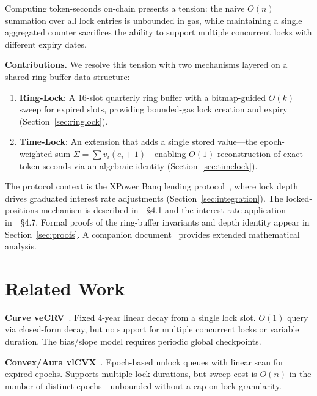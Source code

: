 \documentclass[10pt,a4paper,twocolumn]{article}
\theoremstyle{definition}
\theoremstyle{plain}
\theoremstyle{remark}
\begin{document}
Computing token-seconds on-chain presents a tension: the naive $O(n)$ summation over all lock entries is unbounded in gas, while maintaining a single aggregated counter sacrifices the ability to support multiple concurrent locks with different expiry dates.

\textbf{Contributions.} We resolve this tension with two mechanisms layered on a shared ring-buffer data structure:

\begin{enumerate}[leftmargin=*]
\item \textbf{Ring-Lock}: A 16-slot quarterly ring buffer with a bitmap-guided $O(k)$ sweep for expired slots, providing bounded-gas lock creation and expiry (Section~\ref{sec:ringlock}).

\item \textbf{Time-Lock}: An extension that adds a single stored value---the epoch-weighted sum $\Sigma = \sum v_i(e_i{+}1)$---enabling $O(1)$ reconstruction of exact token-seconds via an algebraic identity (Section~\ref{sec:timelock}).
\end{enumerate}

The protocol context is the XPower Banq lending protocol~\cite{wp}, where lock depth drives graduated interest rate adjustments (Section~\ref{sec:integration}). The locked-positions mechanism is described in~\cite{wp}~\S4.1 and the interest rate application in~\cite{wp}~\S4.7. Formal proofs of the ring-buffer invariants and depth identity appear in Section~\ref{sec:proofs}. A companion document~\cite{apx} provides extended mathematical analysis.

\section{Related Work}
\label{sec:related}

\textbf{Curve veCRV}~\cite{curve}. Fixed 4-year linear decay from a single lock slot. $O(1)$ query via closed-form decay, but no support for multiple concurrent locks or variable duration. The bias/slope model requires periodic global checkpoints.

\textbf{Convex/Aura vlCVX}~\cite{convex}. Epoch-based unlock queues with linear scan for expired epochs. Supports multiple lock durations, but sweep cost is $O(n)$ in the number of distinct epochs---unbounded without a cap on lock granularity.
\end{document}
